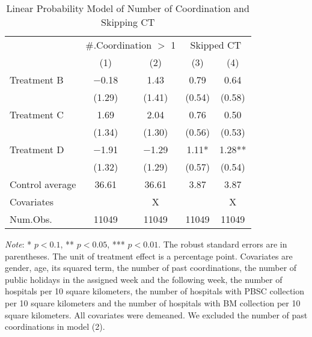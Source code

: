 \documentclass[12pt, a4paper]{article}
\begin{document}
\begin{table}[H]

\caption{\label{tab:lm-skip}Linear Probability Model of Number of Coordination and Skipping CT}
\centering
\fontsize{8}{10}\selectfont
\begin{threeparttable}
\begin{tabular}[t]{lcccc}
\toprule
\multicolumn{1}{c}{ } & \multicolumn{2}{c}{\#.Coordination $>$ 1} & \multicolumn{2}{c}{Skipped CT} \\
\cmidrule(l{3pt}r{3pt}){2-3} \cmidrule(l{3pt}r{3pt}){4-5}
  & (1) & (2) & (3) & (4)\\
\midrule
Treatment B & \num{-0.18} & \num{1.43} & \num{0.79} & \num{0.64}\\
 & (\num{1.29}) & (\num{1.41}) & (\num{0.54}) & (\num{0.58})\\
Treatment C & \num{1.69} & \num{2.04} & \num{0.76} & \num{0.50}\\
 & (\num{1.34}) & (\num{1.30}) & (\num{0.56}) & (\num{0.53})\\
Treatment D & \num{-1.91} & \num{-1.29} & \num{1.11}* & \num{1.28}**\\
 & (\num{1.32}) & (\num{1.29}) & (\num{0.57}) & (\num{0.54})\\
\midrule
Control average & 36.61 & 36.61 & 3.87 & 3.87\\
Covariates &  & X &  & X\\
Num.Obs. & \num{11049} & \num{11049} & \num{11049} & \num{11049}\\
\bottomrule
\end{tabular}
\begin{tablenotes}
\item \emph{Note}: * $p < 0.1$, ** $p < 0.05$, *** $p < 0.01$. The robust standard errors are in parentheses. The unit of treatment effect is a percentage point. Covariates are gender, age, its squared term, the number of past coordinations, the number of public holidays in the assigned week and the following week, the number of hospitals per 10 square kilometers, the number of hospitals with PBSC collection per 10 square kilometers and the number of hospitals with BM collection per 10 square kilometers. All covariates were demeaned. We excluded the number of past coordinations in model (2).
\end{tablenotes}
\end{threeparttable}
\end{table}
\end{document}

